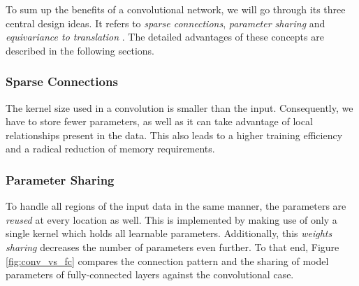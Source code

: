 To sum up the benefits of a convolutional network, we will go through its three central design ideas. It refers to \textit{sparse connections}, \textit{parameter sharing} and \textit{equivariance to translation} \parencite[p. 336ff.]{deep_learning}. The detailed advantages of these concepts are described in the following sections.

\subsubsection*{Sparse Connections}
The kernel size used in a convolution is smaller than the input. Consequently, we have to store fewer parameters, as well as it can take advantage of local relationships present in the data. This also leads to a higher training efficiency and a radical reduction of memory requirements.

\subsubsection*{Parameter Sharing}
To handle all regions of the input data in the same manner, the parameters are \textit{reused} at every location as well. This is implemented by making use of only a single kernel which holds all learnable parameters.  Additionally, this \textit{weights sharing} decreases the number of parameters even further. To that end, Figure \ref{fig:conv_vs_fc} compares the connection pattern  and the sharing of model parameters of fully-connected layers against the convolutional case.

